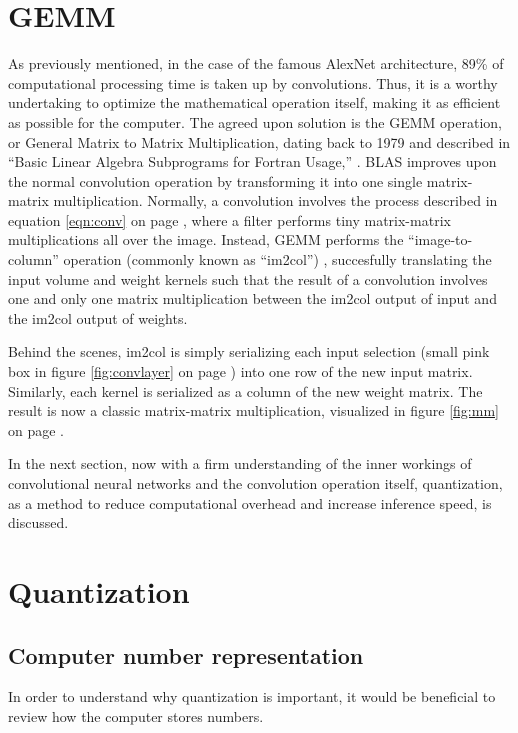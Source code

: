 \section{GEMM}
As previously mentioned, in the case of the famous AlexNet architecture, 89\% of computational processing time is taken up by convolutions. Thus, it is a worthy undertaking to optimize the mathematical operation itself, making it as efficient as possible for the computer. The agreed upon solution is the GEMM operation, or General Matrix to Matrix Multiplication, dating back to 1979 and described in ``Basic Linear Algebra Subprograms for Fortran Usage,'' \cite{BLAS}. BLAS improves upon the normal convolution operation by transforming it into one single matrix-matrix multiplication. Normally, a convolution involves the process described in equation \ref{eqn:conv} on page \pageref{eqn:conv}, where a filter performs tiny matrix-matrix multiplications all over the image. Instead, GEMM performs the ``image-to-column'' operation (commonly known as ``im2col'') \cite{im2col}, succesfully translating the input volume and weight kernels such that the result of a convolution involves one and only one matrix multiplication between the im2col output of input and the im2col output of weights.

Behind the scenes, im2col is simply serializing each input selection (small pink box in figure \ref{fig:convlayer} on page \pageref{fig:convlayer}) into one row of the new input matrix. Similarly, each kernel is serialized as a column of the new weight matrix. The result is now a classic matrix-matrix multiplication, visualized in figure \ref{fig:mm} on page \pageref{fig:mm}.


In the next section, now with a firm understanding of the inner workings of convolutional neural networks and the convolution operation itself, quantization, as a method to reduce computational overhead and increase inference speed, is discussed.

\section{Quantization}
\subsection{Computer number representation}
In order to understand why quantization is important, it would be beneficial to review how the computer stores numbers.


